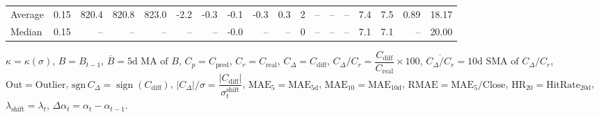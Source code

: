 \begin{threeparttable}
{\begin{tabular}{lrrrrrrrrrrrrrrrrr}
Average &     0.15 & 820.4 & 820.8 & 823.0 &       -2.2 &           -0.3 &                      -0.1 &                     -0.3 &                 0.3 &              2 &         -- &        -- &             -- &              7.4 &                 7.5 &            0.89 &                  18.17 \\
 Median &     0.15 &    -- &    -- &    -- &         -- &             -- &                      -0.0 &                       -- &                  -- &              0 &         -- &        -- &             -- &              7.1 &                 7.1 &              -- &                  20.00 \\
\bottomrule
\end{tabular}
}
\begin{tablenotes}\footnotesize
\item $\kappa=\kappa(\sigma)$, $B=B_{t-1}$, $\overline{B}=\text{5d MA of }B$, $C_p=C_{\text{pred}}$, $C_r=C_{\text{real}}$, $C_\Delta=C_{\text{diff}}$, $C_\Delta/C_r=\dfrac{C_{\text{diff}}}{C_{\text{real}}}\times100$, $\overline{C_\Delta/C_r}=\text{10d SMA of }C_\Delta/C_r$, $\mathrm{Out}=\text{Outlier}$, $\mathrm{sgn}\,C_\Delta=\operatorname{sign}(C_{\text{diff}})$, $|C_\Delta|/\sigma=\dfrac{|C_{\text{diff}}|}{\sigma_t^{\text{shift}}}$, $\mathrm{MAE}_5=\mathrm{MAE}_{5\text{d}}$, $\mathrm{MAE}_{10}=\mathrm{MAE}_{10\text{d}}$, $\mathrm{RMAE}= \mathrm{MAE}_5 / \text{Close}$, $\mathrm{HR}_{20}=\mathrm{HitRate}_{20\text{d}}$, $\lambda_{\text{shift}}=\lambda_t$, $\Delta\alpha_t=\alpha_t-\alpha_{t-1}$.
\end{tablenotes}
\end{threeparttable}
\endgroup

